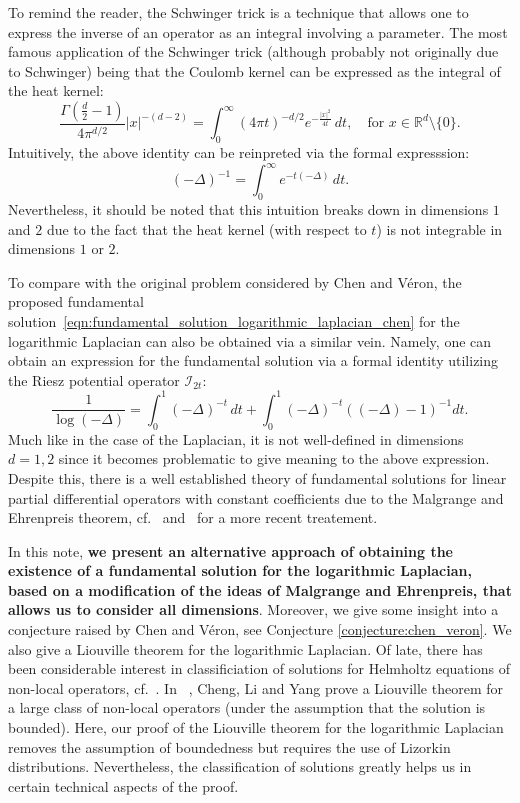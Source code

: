 \documentclass[11pt]{amsart}
\begin{document}
To remind the reader, the Schwinger trick is a technique that allows one to express the inverse of an operator as an integral involving a parameter. The most famous application of the Schwinger trick (although probably not originally due to Schwinger) being that the Coulomb kernel can be expressed as the integral of the heat kernel:
\begin{equation*}
		\frac{\Gamma\left(\frac{d}{2}-1\right)}{4\pi^{d/2}}|x|^{-(d-2)} = \int_0^\infty (4\pi t)^{-d/2} e^{-\frac{|x|^2}{4t}} \, dt, \quad \text{for $x\in \mathbb{R}^d\setminus \{0\}$}. 
\end{equation*}
Intuitively, the above identity can be reinpreted via the formal expresssion:
\begin{equation*}
	(-\Delta)^{-1}=\int_0^\infty e^{-t(-\Delta)} \, dt.
\end{equation*}
Nevertheless, it should be noted that this intuition breaks down in dimensions $1$ and $2$ due to the fact that the heat kernel (with respect to $t$) is not integrable in dimensions $1$ or $2$. 

To compare with the original problem considered by Chen and V\'eron, the proposed fundamental solution~\eqref{eqn:fundamental_solution_logarithmic_laplacian_chen} for the logarithmic Laplacian can also be obtained via a similar vein. Namely, one can obtain an expression for the fundamental solution via a formal identity utilizing the Riesz potential operator $\mathcal{I}_{2t}$:
\begin{equation*}
\frac{1}{\log(-\Delta)}=\int_0^1 (-\Delta)^{-t} \, dt +\int_0^1 (-\Delta)^{-t}((-\Delta)-1)^{-1} dt.
\end{equation*}
 Much like in the case of the Laplacian, it is not well-defined in dimensions $d=1,2$ since it becomes problematic to give meaning to the above expression. Despite this, there is a well established theory of fundamental solutions for linear partial differential operators with constant coefficients due to the Malgrange and Ehrenpreis theorem, cf.~\cite{MR86990,MR70048,MR68123,MR3995092} and~\cite{MR3379898} for a more recent treatement. 

In this note, \textbf{we present an alternative approach of obtaining the existence of a fundamental solution for the logarithmic Laplacian, based on a modification of the ideas of Malgrange and Ehrenpreis, that allows us to consider all dimensions}. Moreover, we give some insight into a conjecture raised by Chen and V\'eron, see Conjecture \ref{conjecture:chen_veron}. We also give a Liouville theorem for the logarithmic Laplacian. Of late, there has been considerable interest in classificiation of solutions for Helmholtz equations of non-local operators, cf.~\cite{MR4709301, MR4546886, MR4845366, MR3511811, hauer2023characterization, MR3477075}. In ~\cite{MR4709301}, Cheng, Li and Yang prove a Liouville theorem for a large class of non-local operators (under the assumption that the solution is bounded). Here, our proof of the Liouville theorem for the logarithmic Laplacian removes the assumption of boundedness but requires the use of Lizorkin distributions. Nevertheless, the classification of solutions greatly helps us in certain technical aspects of the proof. 
\end{document}
